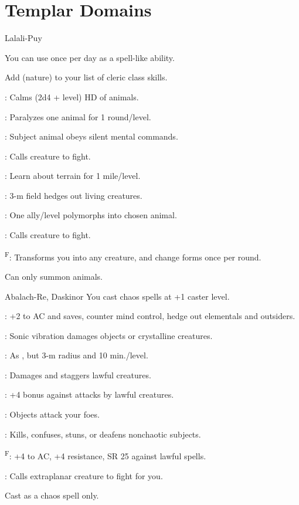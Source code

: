 \section{Templar Domains}

{Lalali-Puy}
{You can use  once per day as a spell-like ability.

Add  (nature) to your list of cleric class skills.}
{
	\item {}: Calms (2d4 + level) HD of animals.
	\item {}: Paralyzes one animal for 1 round/level.
	\item {}: Subject animal obeys silent mental commands.
	\item {}\footnotemark[1]: Calls creature to fight.
	\item {}: Learn about terrain for 1 mile/level.
	\item {}: 3-m field hedges out living creatures.
	\item {}: One ally/level polymorphs into chosen animal.
	\item {}\footnotemark[1]: Calls creature to fight.
	\item {}\textsuperscript{F}: Transforms you into any creature, and change forms once per round.
}
 Can only summon animals.


{Abalach-Re, Daskinor}
{You cast chaos spells at +1 caster level.}
{
	\item {}: +2 to AC and saves, counter mind control, hedge out elementals and outsiders.
	\item {}: Sonic vibration damages objects or crystalline creatures.
	\item {}: As , but 3-m radius and 10 min./level.
	\item {}: Damages and staggers lawful creatures.
	\item {}: +4 bonus against attacks by lawful creatures.
	\item {}: Objects attack your foes.
	\item {}: Kills, confuses, stuns, or deafens nonchaotic subjects.
	\item {}\textsuperscript{F}: +4 to AC, +4 resistance, SR 25 against lawful spells.
	\item {}\footnotemark[1]: Calls extraplanar creature to fight for you.
}
 Cast as a chaos spell only.

